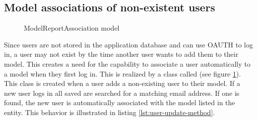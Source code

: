 \newpage

\subsection{Model associations of non-existent users}

\begin{figure}
    \centering

    \caption{ModelReportAssociation model}
    \label{fig:model-assoc}
\end{figure}


Since users are not stored in the application database and can use OAUTH to log in, a user may not exist by the time another user wants to add them to their model. This creates a need for the capability to associate a user automatically to a model when they first log in. This is realized by a class called  (see figure \ref{fig:model-assoc}). This class is created when a user adds a non-existing user to their model. If a new user logs in all saved  are searched for a matching email address. If one is found, the new user is automatically associated with the model listed in the  entity. This behavior is illustrated in listing \ref{lst:user-update-method}.

